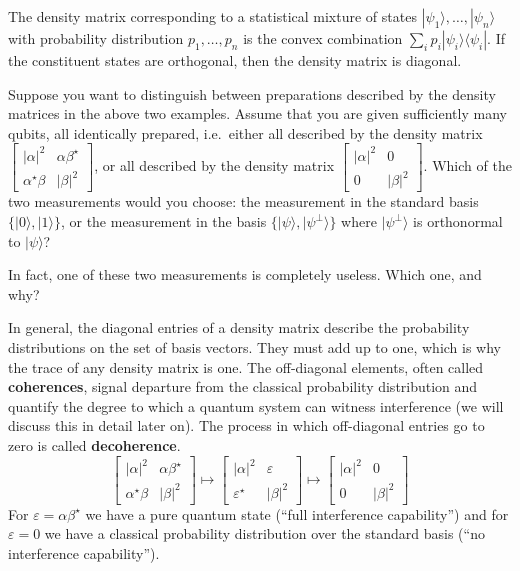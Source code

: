 \documentclass[fleqn]{article}
\newenvironment{idea}{\noindent}{\medskip}
\begin{document}
\begin{idea}
The density matrix corresponding to a statistical mixture of states \(|\psi_1\rangle,\ldots,|\psi_n\rangle\) with probability distribution \(p_1,\ldots,p_n\) is the convex combination \(\sum_i p_i|\psi_i\rangle\langle\psi_i|\).
If the constituent states are orthogonal, then the density matrix is diagonal.

\end{idea}

Suppose you want to distinguish between preparations described by the density matrices in the above two examples.
Assume that you are given sufficiently many qubits, all identically prepared, i.e.~either all described by the density matrix \(\left[\begin{smallmatrix}|\alpha|^2&\alpha\beta^\star\\\alpha^\star\beta&|\beta|^2\end{smallmatrix}\right]\), or all described by the density matrix \(\left[\begin{smallmatrix}|\alpha|^2&0\\0&|\beta|^2\end{smallmatrix}\right]\).
Which of the two measurements would you choose: the measurement in the standard basis \(\{|0\rangle,|1\rangle\}\), or the measurement in the basis \(\{|\psi\rangle,|\psi^\perp\rangle\}\) where \(|\psi^\perp\rangle\) is orthonormal to \(|\psi\rangle\)?

In fact, one of these two measurements is completely useless.
Which one, and why?

In general, the diagonal entries of a density matrix describe the probability distributions on the set of basis vectors.
They must add up to one, which is why the trace of any density matrix is one.
The off-diagonal elements, often called \textbf{coherences}, signal departure from the classical probability distribution and quantify the degree to which a quantum system can witness interference (we will discuss this in detail later on).
The process in which off-diagonal entries go to zero is called \textbf{decoherence}.
\[
  \begin{bmatrix}
    |\alpha|^2 & \alpha\beta^\star
  \\\alpha^\star\beta & |\beta|^2
  \end{bmatrix}
  \longmapsto
  \begin{bmatrix}
    |\alpha|^2 & \varepsilon
  \\\varepsilon^\star & |\beta|^2
  \end{bmatrix}
  \longmapsto
  \begin{bmatrix}
    |\alpha|^2 & 0
  \\0 & |\beta|^2
  \end{bmatrix}
\]
For \(\varepsilon = \alpha\beta^\star\) we have a pure quantum state (``full interference capability'') and for \(\varepsilon=0\) we have a classical probability distribution over the standard basis (``no interference capability'').
\end{document}

